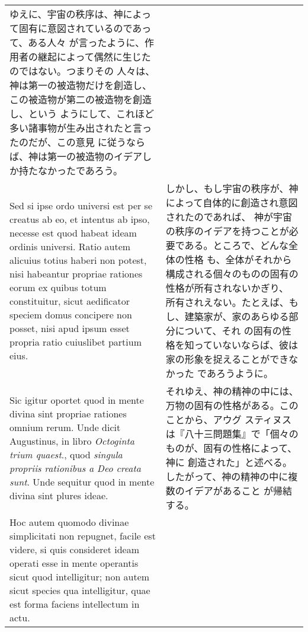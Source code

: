 \documentclass[10pt]{jsarticle} %
\begin{document}
\begin{longtable}{p{21em}p{21em}}
ゆえに、宇宙の秩序は、神によって固有に意図されているのであって、ある人々
が言ったように、作用者の継起によって偶然に生じたのではない。つまりその
人々は、神は第一の被造物だけを創造し、この被造物が第二の被造物を創造し、という
ようにして、これほど多い諸事物が生み出されたと言ったのだが、この意見
 に従うならば、神は第一の被造物のイデアしか持たなかったであろう。

\\




Sed si ipse ordo universi est per se creatus ab eo, et intentus ab ipso,
necesse est quod habeat ideam ordinis universi. Ratio autem alicuius
totius haberi non potest, nisi habeantur propriae rationes eorum ex
quibus totum constituitur, sicut aedificator speciem domus concipere non
posset, nisi apud ipsum esset propria ratio cuiuslibet partium eius. 



&


しかし、もし宇宙の秩序が、神によって自体的に創造され意図されたのであれば、
 神が宇宙の秩序のイデアを持つことが必要である。ところで、どんな全体の性格
 も、全体がそれから構成される個々のものの固有の性格が所有されないかぎり、
 所有されえない。たとえば、もし、建築家が、家のあらゆる部分について、それ
 の固有の性格を知っていないならば、彼は家の形象を捉えることができなかった
 であろうように。


\\


Sic
igitur oportet quod in mente divina sint propriae rationes omnium
rerum. Unde dicit Augustinus, in libro {\itshape Octoginta trium
quaest}., quod {\itshape singula propriis rationibus a Deo creata sunt}. Unde
sequitur quod in mente divina sint plures ideae. 


&

それゆえ、神の精神の中には、万物の固有の性格がある。このことから、アウグ
 スティヌスは『八十三問題集』で「個々のものが、固有の性格によって、神に
 創造された」と述べる。したがって、神の精神の中に複数のイデアがあること
 が帰結する。

\\



\hspace{1em}Hoc autem quomodo
divinae simplicitati non repugnet, facile est videre, si quis consideret
ideam operati esse in mente operantis sicut quod intelligitur; non autem
sicut species qua intelligitur, quae est forma faciens intellectum in
actu. 


\end{longtable}
\end{document}
